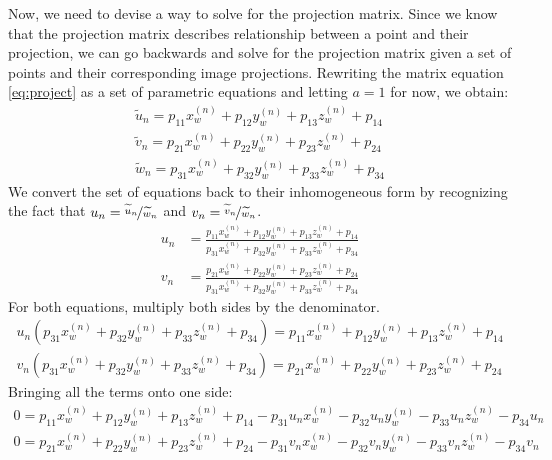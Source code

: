 Now, we need to devise a way to solve for the projection matrix. Since we know that the projection matrix describes relationship between a point and their projection, we can go backwards and solve for the projection matrix given a set of points and their corresponding image projections. Rewriting the matrix equation \ref{eq:project} as a set of parametric equations and letting $a=1$ for now, we obtain:
\begin{align*}
    \widetilde{u}_n = p_{11}x_w^{(n)} + p_{12}y_w^{(n)} + p_{13}z_w^{(n)} + p_{14} \\
    \widetilde{v}_n = p_{21}x_w^{(n)} + p_{22}y_w^{(n)} + p_{23}z_w^{(n)} + p_{24} \\
    \widetilde{w}_n = p_{31}x_w^{(n)} + p_{32}y_w^{(n)} + p_{33}z_w^{(n)} + p_{34}
\end{align*}
We convert the set of equations back to their inhomogeneous form by recognizing the fact that $u_n = \nicefrac{\widetilde{u}_n}{\widetilde{w}_n}$ and $v_n = \nicefrac{\widetilde{v}_n}{\widetilde{w}_n}$. 
\begin{align*}
    u_n & = \frac{p_{11}x_w^{(n)} + p_{12}y_w^{(n)} + p_{13}z_w^{(n)} + p_{14}}{p_{31}x_w^{(n)} + p_{32}y_w^{(n)} + p_{33}z_w^{(n)} + p_{34}} \\
    v_n & = \frac{p_{21}x_w^{(n)} + p_{22}y_w^{(n)} + p_{23}z_w^{(n)} + p_{24}}{p_{31}x_w^{(n)} + p_{32}y_w^{(n)} + p_{33}z_w^{(n)} + p_{34}}
\end{align*}
For both equations, multiply both sides by the denominator.
\begin{align*}
    u_n(p_{31}x_w^{(n)} + p_{32}y_w^{(n)} + p_{33}z_w^{(n)} + p_{34}) = p_{11}x_w^{(n)} + p_{12}y_w^{(n)} + p_{13}z_w^{(n)} + p_{14} \\
    v_n(p_{31}x_w^{(n)} + p_{32}y_w^{ (n)} + p_{33}z_w^{(n)} + p_{34}) = p_{21}x_w^{(n)} + p_{22}y_w^{(n)} + p_{23}z_w^{(n)} + p_{24}
\end{align*}
Bringing all the terms onto one side:
\begin{subequations}
    \begin{align}
        0 = p_{11}x_w^{(n)} + p_{12}y_w^{(n)} + p_{13}z_w^{(n)} + p_{14} - p_{31}u_nx_w^{(n)} - p_{32}u_ny_w^{(n)} - p_{33}u_nz_w^{(n)} - p_{34}u_n \\
        0 = p_{21}x_w^{(n)} + p_{22}y_w^{(n)} + p_{23}z_w^{(n)} + p_{24} - p_{31}v_nx_w^{(n)} - p_{32}v_ny_w^{(n)} - p_{33}v_nz_w^{(n)} - p_{34}v_n
    \end{align}
\end{subequations}

